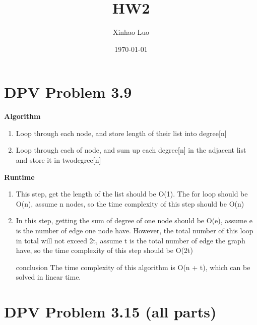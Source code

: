 \documentclass{article}
\title{HW2}
\author{Xinhao Luo}
\date{\today}
\begin{document}
\maketitle

\section{DPV Problem 3.9}

\textbf{Algorithm}

\begin{enumerate}[Step 1]
    \item Loop through each node, and store length of their list into degree[n]
    \item Loop through each of node, and sum up each degree[n] in the adjacent list and store it in twodegree[n]
\end{enumerate} 

\textbf{Runtime}

\begin{enumerate}[Step 1]
    \item This step, get the length of the list should be O(1). The for loop should be O(n), assume n nodes, so the time complexity of this step should be O(n)
    \item In this step, getting the sum of degree of one node should be O(e), assume e is the number of edge one node have. However, the total number of this loop in total will not exceed 2t, assume t is the total number of edge the graph have, so the time complexity of this step should be O(2t)
    \item [conclusion] The time complexity of this algorithm is O(n + t), which can be solved in linear time.
\end{enumerate}


\section{DPV Problem 3.15 (all parts)}
\end{document}
